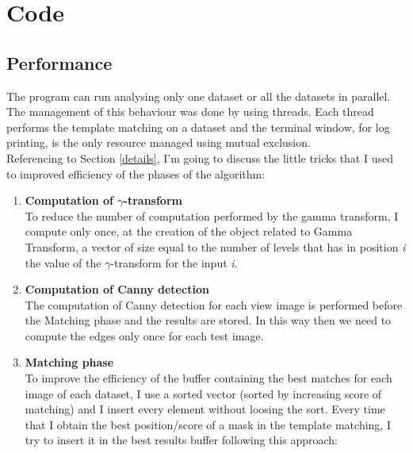 \documentclass{article}
\begin{document}
\section{Code}
\subsection{Performance}
The program can run analysing only one dataset or all the datasets in parallel. The management of this behaviour was done by using threads. Each thread performs the template matching on a dataset and the terminal window, for log printing, is the only resource managed using mutual exclusion.\\
Referencing to Section \ref{details}, I'm going to discuss the little tricks that I used to improved efficiency of the phases of the algorithm:
\begin{enumerate}
\item{\textbf{Computation of $\gamma$-transform}\\
To reduce the number of computation performed by the gamma transform, I compute only once, at the creation of the object related to Gamma Transform, a vector of size equal to the number of levels that has in position \textit{i} the value of the $\gamma$-transform for the input \textit{i}.}
\item{\textbf{Computation of Canny detection}\\
The computation of Canny detection for each view image is performed before the Matching phase and the results are stored. In this way then we need to compute the edges only once for each test image.
}
\item{\textbf{Matching phase}\\
To improve the efficiency of the buffer containing the best matches for each image of each dataset, I use a sorted vector (sorted by increasing score of matching) and I insert every element without loosing the sort. Every time that I obtain the best position/score of a mask in the template matching, I try to insert it in the best results buffer following this approach:\\\\
\begin{minipage}{.999\linewidth}
\begin{algorithm}[H]
\DontPrintSemicolon
\BlankLine
\end{algorithm}
\end{minipage}}
\end{enumerate}
\end{document}
